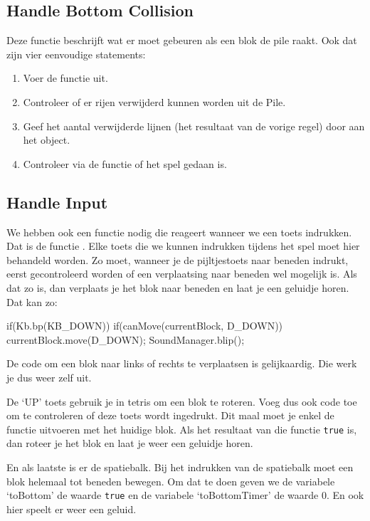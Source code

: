 \subsection{Handle Bottom Collision}
Deze functie beschrijft wat er moet gebeuren als een blok de pile raakt. Ook dat zijn vier eenvoudige statements:

\begin{enumerate}
	\item Voer de functie  uit.
	\item Controleer of er rijen verwijderd kunnen worden uit de Pile.
	\item Geef het aantal verwijderde lijnen (het resultaat van de vorige regel) door aan het  object.
	\item Controleer via de functie  of het spel gedaan is.
\end{enumerate}

\subsection{Handle Input}
We hebben ook een functie nodig die reageert wanneer we een toets indrukken. Dat is de functie . Elke toets die we kunnen indrukken tijdens het spel moet hier behandeld worden. Zo moet, wanneer je de pijltjestoets naar beneden indrukt, eerst gecontroleerd worden of een verplaatsing naar beneden wel mogelijk is. Als dat zo is, dan verplaats je het blok naar beneden en laat je een geluidje horen. Dat kan zo:

\begin{code}
if(Kb.bp(KB_DOWN))
{
	 if(canMove(currentBlock, D_DOWN))
	 {
			currentBlock.move(D_DOWN);
			SoundManager.blip();
	 }
}
\end{code}

De code om een blok naar links of rechts te verplaatsen is gelijkaardig. Die werk je dus weer zelf uit.

De `UP' toets gebruik je in tetris om een blok te roteren. Voeg dus ook code toe om te controleren of deze toets wordt ingedrukt. Dit maal moet je enkel de functie  uitvoeren met het huidige blok. Als het resultaat van die functie \verb|true| is, dan roteer je het blok en laat je weer een geluidje horen.

En als laatste is er de spatiebalk. Bij het indrukken van de spatiebalk moet een blok helemaal tot beneden bewegen. Om dat te doen geven we de variabele `toBottom' de waarde \verb|true| en de variabele `toBottomTimer' de waarde 0. En ook hier speelt er weer een geluid.


